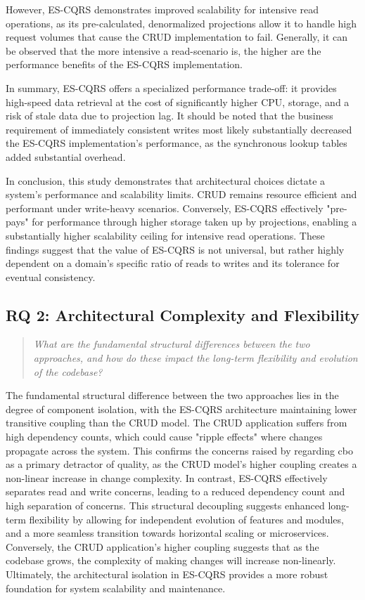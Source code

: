 However, ES-CQRS demonstrates improved scalability for intensive read operations, as its pre-calculated, denormalized projections allow it to handle high request volumes that cause the CRUD implementation to fail. Generally, it can be observed that the more intensive a read-scenario is, the higher are the performance benefits of the ES-CQRS implementation.

In summary, ES-CQRS offers a specialized performance trade-off: it provides high-speed data retrieval at the cost of significantly higher CPU, storage, and a risk of stale data due to projection lag. It should be noted that the business requirement of immediately consistent writes most likely substantially decreased the ES-CQRS implementation's performance, as the synchronous lookup tables added substantial overhead.

In conclusion, this study demonstrates that architectural choices dictate a system's performance and scalability limits. CRUD remains resource efficient and performant under write-heavy scenarios. Conversely, ES-CQRS effectively "pre-pays" for performance through higher storage taken up by projections, enabling a substantially higher scalability ceiling for intensive read operations. These findings suggest that the value of ES-CQRS is not universal, but rather highly dependent on a domain's specific ratio of reads to writes and its tolerance for eventual consistency.

\subsection{RQ 2: Architectural Complexity and Flexibility}
\label{sec:answering-rq-2}

\begin{quote}
    \textit{What are the fundamental structural differences between the two approaches, and how do these impact the long-term flexibility and evolution of the codebase?}
\end{quote}

The fundamental structural difference between the two approaches lies in the degree of component isolation, with the ES-CQRS architecture maintaining lower transitive coupling than the CRUD model. The CRUD application suffers from high dependency counts, which could cause "ripple effects" where changes propagate across the system. This confirms the concerns raised by \textcite{singh_object_2018} regarding \gls{cbo} as a primary detractor of quality, as the CRUD model's higher coupling creates a non-linear increase in change complexity. In contrast, ES-CQRS effectively separates read and write concerns, leading to a reduced dependency count and high separation of concerns. This structural decoupling suggests enhanced long-term flexibility by allowing for independent evolution of features and modules, and a more seamless transition towards horizontal scaling or microservices. Conversely, the CRUD application's higher coupling suggests that as the codebase grows, the complexity of making changes will increase non-linearly. Ultimately, the architectural isolation in ES-CQRS provides a more robust foundation for system scalability and maintenance.

